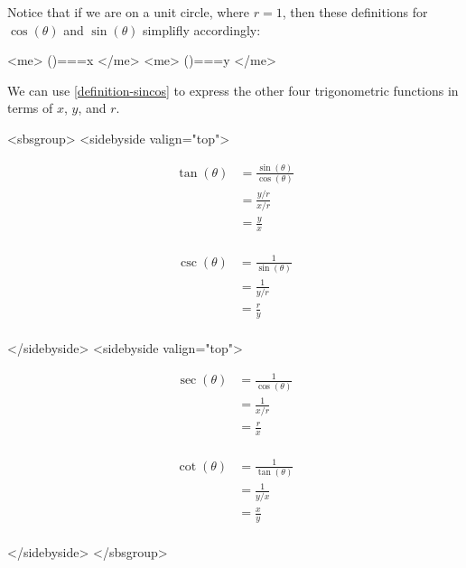         Notice that if we are on a unit circle, where $r=1$, then these definitions for $\cos(\theta)$ and $\sin(\theta)$ simplifly accordingly:
      
      
        <me>  \cos(\theta)===x  </me>
        <me>  \sin(\theta)===y  </me>
      

      
        We can use \ref{definition-sincos} to express the other four trigonometric functions in terms of $x$, $y$, and $r$.
      
      <sbsgroup>
        <sidebyside valign="top">
           
             \begin{align*}
                \tan(\theta) &= \frac{\sin(\theta)}{\cos(\theta)}  \\
                &= \frac{y/r}{x/r} \\
                &= \frac{y}{x} \\
             \end{align*}
           
           
             \begin{align*}
                \csc(\theta) &= \frac{1}{\sin(\theta)} \\
                &= \frac{1}{y/r} \\
                &= \frac{r}{y} \\
             \end{align*}
           
        </sidebyside>
        <sidebyside valign="top">
          
            \begin{align*}
               \sec(\theta) &= \frac{1}{\cos(\theta)} \\
               &= \frac{1}{x/r} \\
               &= \frac{r}{x} \\
            \end{align*}
          
          
            \begin{align*}
               \cot(\theta) &= \frac{1}{\tan(\theta)} \\
               &= \frac{1}{y/x} \\
               &= \frac{x}{y} \\
            \end{align*}
          
        </sidebyside>
      </sbsgroup>
      
